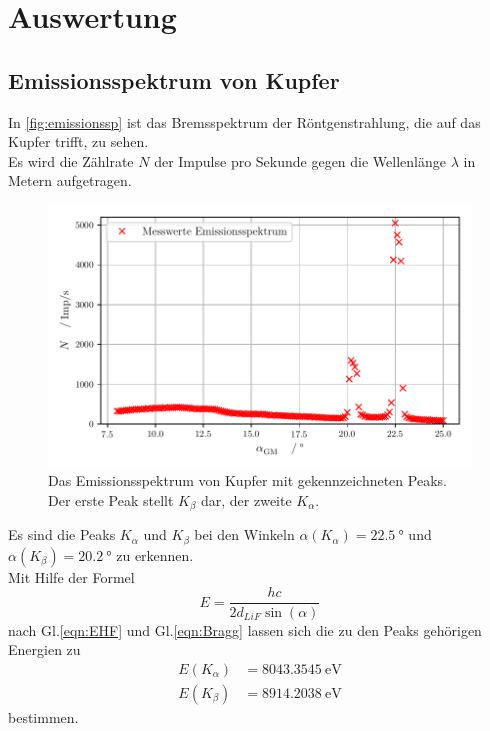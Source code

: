 \section{Auswertung}
\label{sec:Auswertung}
\subsection{Emissionsspektrum von Kupfer}
\label{subsec:spektrumCU}


In \autoref{fig:emissionssp} ist das Bremsspektrum der Röntgenstrahlung, die auf das Kupfer trifft, zu sehen.\\
Es wird die Zählrate $N$ der Impulse pro Sekunde gegen die Wellenlänge $\lambda$ in Metern aufgetragen.\\

\begin{figure}[H]
  \centering
  \includegraphics{build/emissionsspektrum.pdf}
  \caption{Das Emissionsspektrum von Kupfer mit gekennzeichneten Peaks. Der erste Peak stellt $K_{\beta}$ dar, der zweite $K_{\alpha}$.}
  \label{fig:emissionssp}
\end{figure}

\noindent Es sind die Peaks $K_{\alpha}$ und $K_{\beta}$ bei den Winkeln $\alpha(K_{\alpha})= \SI{22,5}{\degree}$ 
und $\alpha(K_{\beta}) = \SI{20,2}{\degree}$ zu erkennen.\\

\noindent Mit Hilfe der Formel
\begin{equation*}
  E = \frac{hc}{2d_{LiF}\sin\left(\alpha\right)}
\end{equation*}
nach Gl.\eqref{eqn:EHF} und Gl.\eqref{eqn:Bragg} lassen sich die zu den Peaks gehörigen Energien zu
\begin{align*}
  E(K_{\alpha}) &= \SI{8043,3545}{\electronvolt} \\
  E(K_{\beta}) &= \SI{8914,2038}{\electronvolt}
\end{align*}
bestimmen.




